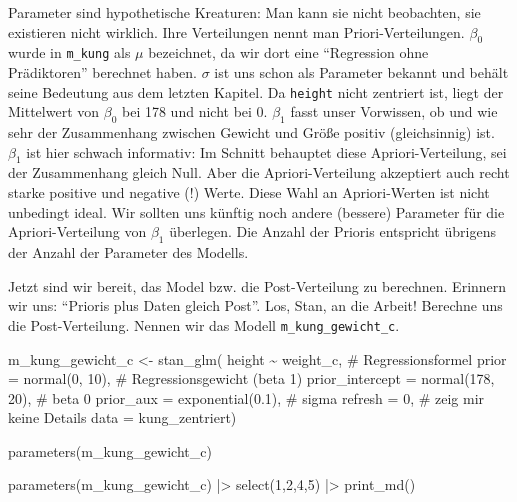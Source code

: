 \documentclass[
  ngerman,
  letterpaper,
  twoside,
  open=any]{scrbook}
\newenvironment{Shaded}{\begin{snugshade}}{\end{snugshade}}
\newcommand{\AttributeTok}[1]{\textcolor[rgb]{0.40,0.45,0.13}{#1}}
\newcommand{\CommentTok}[1]{\textcolor[rgb]{0.37,0.37,0.37}{#1}}
\newcommand{\DecValTok}[1]{\textcolor[rgb]{0.68,0.00,0.00}{#1}}
\newcommand{\FloatTok}[1]{\textcolor[rgb]{0.68,0.00,0.00}{#1}}
\newcommand{\FunctionTok}[1]{\textcolor[rgb]{0.28,0.35,0.67}{#1}}
\newcommand{\NormalTok}[1]{\textcolor[rgb]{0.00,0.23,0.31}{#1}}
\newcommand{\OtherTok}[1]{\textcolor[rgb]{0.00,0.23,0.31}{#1}}
\newcommand{\SpecialCharTok}[1]{\textcolor[rgb]{0.37,0.37,0.37}{#1}}
\theoremstyle{definition}
\theoremstyle{plain}
\theoremstyle{definition}
\theoremstyle{definition}
\theoremstyle{definition}
\theoremstyle{definition}
\theoremstyle{remark}
\begin{document}
Parameter sind hypothetische Kreaturen: Man kann sie nicht beobachten,
sie existieren nicht wirklich. Ihre Verteilungen nennt man
Priori-Verteilungen. \(\beta_0\) wurde in \texttt{m\_kung} als \(\mu\)
bezeichnet, da wir dort eine \enquote{Regression ohne Prädiktoren}
berechnet haben. \(\sigma\) ist uns schon als Parameter bekannt und
behält seine Bedeutung aus dem letzten Kapitel. Da \texttt{height} nicht
zentriert ist, liegt der Mittelwert von \(\beta_0\) bei 178 und nicht
bei 0. \(\beta_1\) fasst unser Vorwissen, ob und wie sehr der
Zusammenhang zwischen Gewicht und Größe positiv (gleichsinnig) ist.
\(\beta_1\) ist hier schwach informativ: Im Schnitt behauptet diese
Apriori-Verteilung, sei der Zusammenhang gleich Null. Aber die
Apriori-Verteilung akzeptiert auch recht starke positive und negative
(!) Werte. Diese Wahl an Apriori-Werten ist nicht unbedingt ideal. Wir
sollten uns künftig noch andere (bessere) Parameter für die
Apriori-Verteilung von \(\beta_1\) überlegen. Die Anzahl der Prioris
entspricht übrigens der Anzahl der Parameter des Modells.

Jetzt sind wir bereit, das Model bzw. die Post-Verteilung zu berechnen.
Erinnern wir uns: \enquote{Prioris plus Daten gleich Post}. Los, Stan,
an die Arbeit! Berechne uns die Post-Verteilung. Nennen wir das Modell
\texttt{m\_kung\_gewicht\_c}.

\begin{Shaded}
\begin{Highlighting}[]
\NormalTok{m\_kung\_gewicht\_c }\OtherTok{\textless{}{-}}
  \FunctionTok{stan\_glm}\NormalTok{(}
\NormalTok{    height }\SpecialCharTok{\textasciitilde{}}\NormalTok{ weight\_c,  }\CommentTok{\# Regressionsformel}
    \AttributeTok{prior =} \FunctionTok{normal}\NormalTok{(}\DecValTok{0}\NormalTok{, }\DecValTok{10}\NormalTok{),  }\CommentTok{\# Regressionsgewicht (beta 1)}
    \AttributeTok{prior\_intercept =} \FunctionTok{normal}\NormalTok{(}\DecValTok{178}\NormalTok{, }\DecValTok{20}\NormalTok{),  }\CommentTok{\# beta 0}
    \AttributeTok{prior\_aux =} \FunctionTok{exponential}\NormalTok{(}\FloatTok{0.1}\NormalTok{),  }\CommentTok{\# sigma}
    \AttributeTok{refresh =} \DecValTok{0}\NormalTok{,  }\CommentTok{\# zeig mir keine Details}
    \AttributeTok{data =}\NormalTok{ kung\_zentriert)}

\FunctionTok{parameters}\NormalTok{(m\_kung\_gewicht\_c)}
\end{Highlighting}
\end{Shaded}

\begin{Shaded}
\begin{Highlighting}[]
\FunctionTok{parameters}\NormalTok{(m\_kung\_gewicht\_c) }\SpecialCharTok{|\textgreater{}}
  \FunctionTok{select}\NormalTok{(}\DecValTok{1}\NormalTok{,}\DecValTok{2}\NormalTok{,}\DecValTok{4}\NormalTok{,}\DecValTok{5}\NormalTok{) }\SpecialCharTok{|\textgreater{}}
  \FunctionTok{print\_md}\NormalTok{()}
\end{Highlighting}
\end{Shaded}
\end{document}
